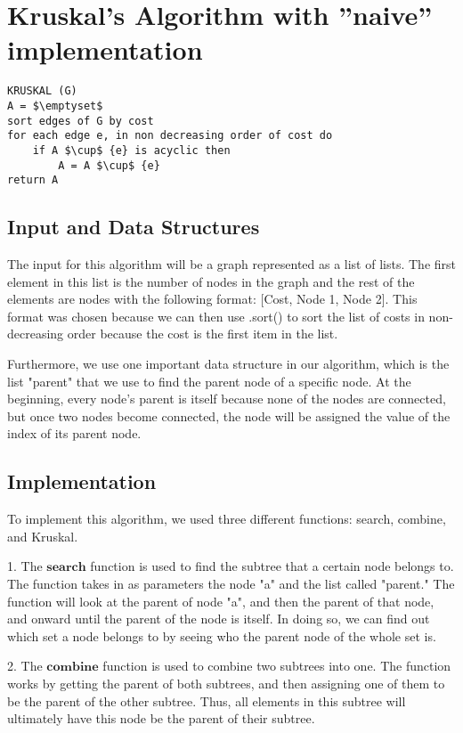 \section{Kruskal's Algorithm with ''naive'' implementation}\label{kruskal_naive}

\begin{lstlisting}[mathescape=true]
KRUSKAL (G)
A = $\emptyset$
sort edges of G by cost
for each edge e, in non decreasing order of cost do
	if A $\cup$ {e} is acyclic then
		A = A $\cup$ {e}
return A	
\end{lstlisting}


\subsection{Input and Data Structures}

The input for this algorithm will be a graph represented as a list of lists. The first element in this list is the number of nodes in the graph and the rest of the elements are nodes with the following format: [Cost, Node 1, Node 2]. This format was chosen because we can then use .sort() to sort the list of costs in non-decreasing order because the cost is the first item in the list. 

Furthermore, we use one important data structure in our algorithm, which is the list "parent" that we use to find the parent node of a specific node. At the beginning, every node's parent is itself because none of the nodes are connected, but once two nodes become connected, the node will be assigned the value of the index of its parent node. 


\subsection{Implementation}
To implement this algorithm, we used three different functions: search, combine, and Kruskal.

1. The $\textbf{search}$ function is used to find the subtree that a certain node belongs to. The function takes in as parameters the node "a" and the list called "parent." The function will look at the parent of node "a", and then the parent of that node, and onward until the parent of the node is itself. In doing so, we can find out which set a node belongs to by seeing who the parent node of the whole set is.

2. The $\textbf{combine}$ function is used to combine two subtrees into one. The function works by getting the parent of both subtrees, and then assigning one of them to be the parent of the other subtree. Thus, all elements in this subtree will ultimately have this node be the parent of their subtree. 

